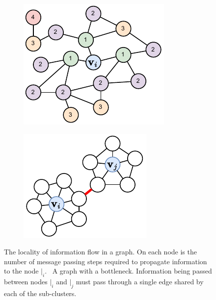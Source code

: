\begin{figure}
    \centering
    \begin{subfigure}[b]{0.3\textwidth}
        \centering
        \includegraphics[width=\textwidth]{Figures/graph_networks/neighbours.pdf}
        \caption{}
        \label{fig:neighbours}
    \end{subfigure}
    \begin{subfigure}[b]{0.3\textwidth}
        \centering
        \includegraphics[width=\textwidth]{Figures/graph_networks/bottleneck.pdf}
        \caption{}
        \label{fig:bottleneck}
    \end{subfigure}
    \caption{ The locality of information flow in a graph. On each node is the number of message passing steps required to propagate information to the node $\vert_i$.\  A graph with a bottleneck. Information being passed between nodes $\vert_i$ and $\vert_j$ must pass through a single edge shared by each of the sub-clusters.}
    \label{fig:over_squashing}
\end{figure}

